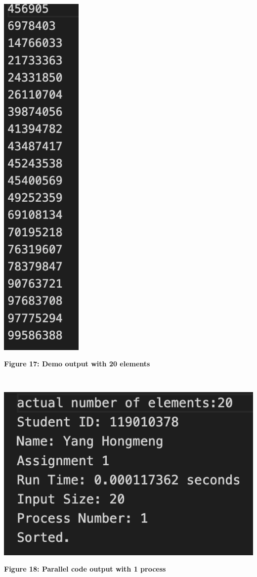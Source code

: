 \centerline {\includegraphics[scale = 1, width=4cm]{para_out}}
\centerline{\textbf {Figure 17: Demo output with 20 elements}}
~\\
\centerline {\includegraphics[scale = 1, width=14cm]{para_1}}
\centerline{\textbf {Figure 18: Parallel code output with 1 process}}

